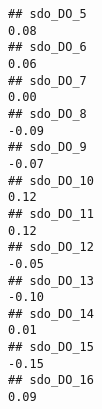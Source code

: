 \documentclass[
]{article}
\begin{document}
\begin{verbatim}
## sdo_DO_5                                                                                                                                                                                                                     0.08
## sdo_DO_6                                                                                                                                                                                                                     0.06
## sdo_DO_7                                                                                                                                                                                                                     0.00
## sdo_DO_8                                                                                                                                                                                                                    -0.09
## sdo_DO_9                                                                                                                                                                                                                    -0.07
## sdo_DO_10                                                                                                                                                                                                                    0.12
## sdo_DO_11                                                                                                                                                                                                                    0.12
## sdo_DO_12                                                                                                                                                                                                                   -0.05
## sdo_DO_13                                                                                                                                                                                                                   -0.10
## sdo_DO_14                                                                                                                                                                                                                    0.01
## sdo_DO_15                                                                                                                                                                                                                   -0.15
## sdo_DO_16                                                                                                                                                                                                                    0.09

\end{verbatim}
\end{document}
